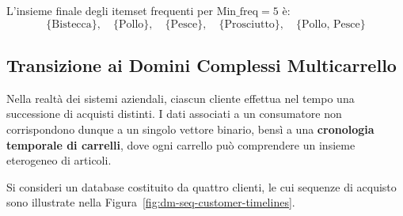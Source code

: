 \begin{example}
L'insieme finale degli itemset frequenti per $\text{Min\_freq} = 5$ è:
\begin{equation}
\{\text{Bistecca}\}, \quad \{\text{Pollo}\}, \quad \{\text{Pesce}\}, \quad \{\text{Prosciutto}\}, \quad \{\text{Pollo, Pesce}\}
\end{equation}
\end{example}

\FloatBarrier
\subsection{Transizione ai Domini Complessi Multicarrello}
Nella realtà dei sistemi aziendali, ciascun cliente effettua nel tempo una successione di acquisti distinti. I dati associati a un consumatore non corrispondono dunque a un singolo vettore binario, bensì a una \textbf{cronologia temporale di carrelli}, dove ogni carrello può comprendere un insieme eterogeneo di articoli.

Si consideri un database costituito da quattro clienti, le cui sequenze di acquisto sono illustrate nella Figura~\ref{fig:dm-seq-customer-timelines}.


